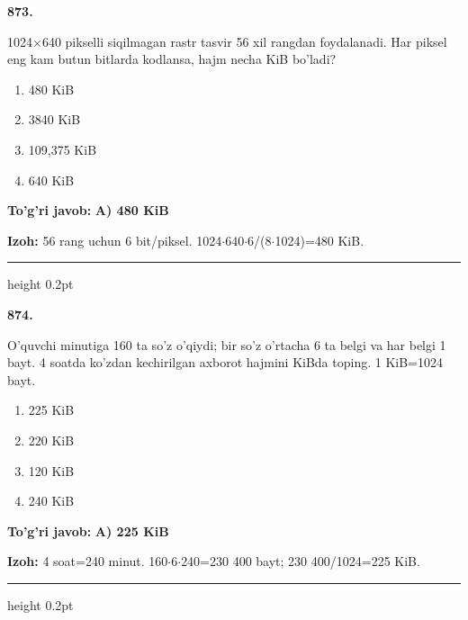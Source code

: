 \documentclass[10pt,a4paper,oneside]{article}
\begin{document}
\noindent\textbf{\color{ink}873.}
\par
1024\ensuremath{\times}640 pikselli siqilmagan rastr tasvir 56 xil rangdan foydalanadi. Har piksel eng kam butun bitlarda kodlansa, hajm necha KiB bo'ladi?
\begin{enumerate}[label=\Alph*),leftmargin=9mm]
\item 480 KiB
\item 3840 KiB
\item 109,375 KiB
\item 640 KiB
\end{enumerate}
\begin{tcolorbox}[enhanced,breakable,colback=teal!4,colframe=teal!50!black,boxrule=0.5pt,arc=1.1mm,left=3mm,right=3mm,top=1.7mm,bottom=1.7mm,before skip=2mm,after skip=2mm]
\textbf{\color{teal}To'g'ri javob:} \textbf{A) 480 KiB}
\par\smallskip
\textbf{Izoh:} 56 rang uchun 6 bit/piksel. 1024\ensuremath{\cdot}640\ensuremath{\cdot}6/(8\ensuremath{\cdot}1024)=480 KiB.
\end{tcolorbox}
\vspace{2mm}\hrule height 0.2pt \vspace{3mm}

\noindent\textbf{\color{ink}874.}
\par
O'quvchi minutiga 160 ta so'z o'qiydi; bir so'z o'rtacha 6 ta belgi va har belgi 1 bayt. 4 soatda ko'zdan kechirilgan axborot hajmini KiBda toping. 1 KiB=1024 bayt.
\begin{enumerate}[label=\Alph*),leftmargin=9mm]
\item 225 KiB
\item 220 KiB
\item 120 KiB
\item 240 KiB
\end{enumerate}
\begin{tcolorbox}[enhanced,breakable,colback=teal!4,colframe=teal!50!black,boxrule=0.5pt,arc=1.1mm,left=3mm,right=3mm,top=1.7mm,bottom=1.7mm,before skip=2mm,after skip=2mm]
\textbf{\color{teal}To'g'ri javob:} \textbf{A) 225 KiB}
\par\smallskip
\textbf{Izoh:} 4 soat=240 minut. 160\ensuremath{\cdot}6\ensuremath{\cdot}240=230 400 bayt; 230 400/1024=225 KiB.
\end{tcolorbox}
\vspace{2mm}\hrule height 0.2pt \vspace{3mm}
\end{document}
